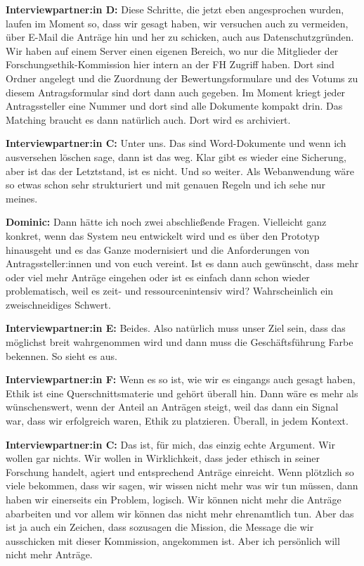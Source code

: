 \documentclass[a4paper,12pt,twoside]{scrreprt}
\begin{document}
\textbf{Interviewpartner:in D:} Diese Schritte, die jetzt eben angesprochen wurden, laufen im Moment so, dass wir gesagt haben, wir versuchen auch zu vermeiden, über E-Mail die Anträge hin und her zu schicken, auch aus Datenschutzgründen. Wir haben auf einem Server einen eigenen Bereich, wo nur die Mitglieder der Forschungsethik-Kommission hier intern an der FH Zugriff haben. Dort sind Ordner angelegt und die Zuordnung der Bewertungsformulare und des Votums zu diesem Antragsformular sind dort dann auch gegeben. Im Moment kriegt jeder Antragssteller eine Nummer und dort sind alle Dokumente kompakt drin. Das Matching braucht es dann natürlich auch. Dort wird es archiviert.

\textbf{Interviewpartner:in C:} Unter uns. Das sind Word-Dokumente und wenn ich ausversehen löschen sage, dann ist das weg. Klar gibt es wieder eine Sicherung, aber ist das der Letztstand, ist es nicht. Und so weiter. Als Webanwendung wäre so etwas schon sehr strukturiert und mit genauen Regeln und ich sehe nur meines.

\textbf{Dominic:} Dann hätte ich noch zwei abschließende Fragen. Vielleicht ganz konkret, wenn das System neu entwickelt wird und es über den Prototyp hinausgeht und es das Ganze modernisiert und die Anforderungen von Antragssteller:innen und von euch vereint. Ist es dann auch gewünscht, dass mehr oder viel mehr Anträge eingehen oder ist es einfach dann schon wieder problematisch, weil es zeit- und ressourcenintensiv wird? Wahrscheinlich ein zweischneidiges Schwert.

\textbf{Interviewpartner:in E:} Beides. Also natürlich muss unser Ziel sein, dass das möglichst breit wahrgenommen wird und dann muss die Geschäftsführung Farbe bekennen. So sieht es aus.

\textbf{Interviewpartner:in F:} Wenn es so ist, wie wir es eingangs auch gesagt haben, Ethik ist eine Querschnittsmaterie und gehört überall hin. Dann wäre es mehr als wünschenswert, wenn der Anteil an Anträgen steigt, weil das dann ein Signal war, dass wir erfolgreich waren, Ethik zu platzieren. Überall, in jedem Kontext.

\textbf{Interviewpartner:in C:} Das ist, für mich, das einzig echte Argument. Wir wollen gar nichts. Wir wollen in Wirklichkeit, dass jeder ethisch in seiner Forschung handelt, agiert und entsprechend Anträge einreicht. Wenn plötzlich so viele bekommen, dass wir sagen, wir wissen nicht mehr was wir tun müssen, dann haben wir einerseits ein Problem, logisch. Wir können nicht mehr die Anträge abarbeiten und vor allem wir können das nicht mehr ehrenamtlich tun. Aber das ist ja auch ein Zeichen, dass sozusagen die Mission, die Message die wir ausschicken mit dieser Kommission, angekommen ist. Aber ich persönlich will nicht mehr Anträge.
\end{document}
